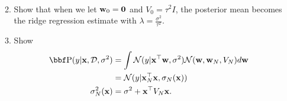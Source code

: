 \documentclass[12pt,letterpaper,fleqn]{hmcpset}
\begin{document}
\begin{enumerate}[(a)]
\begin{enumerate}
\begin{align*}
                \end{align*}
            \item Show that when we let ${\bf w}_0={\bf 0}$ and $V_0=\tau^2 I$, the posterior
                mean becomes the ridge regression estimate with
                $\lambda = \frac{\sigma^2}{\tau^2}$.
            \item Show \begin{align*}
                \PP(y|\xx,\Dc,\sigma^2) &= \int\Nc(y|\xx^\T\ww, \sigma^2)\Nc(\ww,\ww_N,V_N)d\ww\\
                    &= \Nc(y|\xx_N^\T\xx, \sigma_N(\xx))\\
                    \sigma_N^2(\xx) &= \sigma^2 + \xx^\T V_N\xx.
                \end{align*}
        \end{enumerate}
\end{enumerate}
\clearpage
\end{document}
